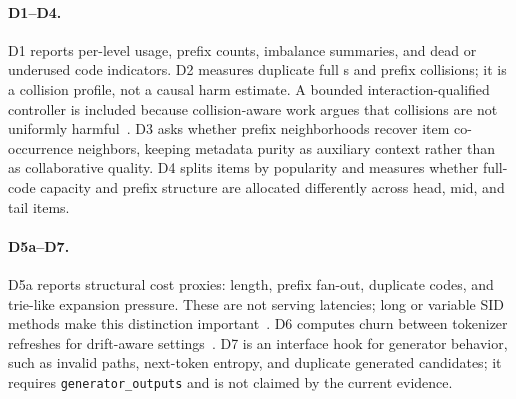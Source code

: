 \paragraph{D1--D4.}
D1 reports per-level usage, prefix counts, imbalance summaries, and dead or
underused code indicators. D2 measures duplicate full \sid{}s and prefix
collisions; it is a collision profile, not a causal harm estimate. A bounded
interaction-qualified controller is included because collision-aware work
argues that collisions are not uniformly harmful~\cite{hu2026quasid}. D3 asks
whether prefix neighborhoods recover item co-occurrence neighbors, keeping
metadata purity as auxiliary context rather than as collaborative quality. D4
splits items by popularity and measures whether full-code capacity and prefix
structure are allocated differently across head, mid, and tail items.

\paragraph{D5a--D7.}
D5a reports structural cost proxies: \sid length, prefix fan-out, duplicate
codes, and trie-like expansion pressure. These are not serving latencies; long
or variable SID methods make this distinction important~\cite{xia2026acerec,cheng2026capsid}.
D6 computes churn between tokenizer refreshes for drift-aware settings~\cite{feng2026dact,baikalov2026staleness}.
D7 is an interface hook for generator behavior, such as invalid paths,
next-token entropy, and duplicate generated candidates; it requires
\texttt{generator\_outputs} and is not claimed by the current evidence.
